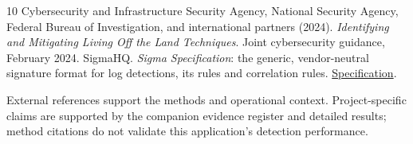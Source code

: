 \documentclass[11pt,a4paper]{article}
\begin{document}
\begin{thebibliography}{10}
 Cybersecurity and Infrastructure Security Agency, National Security Agency, Federal Bureau of Investigation, and international partners (2024). \emph{Identifying and Mitigating Living Off the Land Techniques}. Joint cybersecurity guidance, February 2024.
 SigmaHQ. \emph{Sigma Specification}: the generic, vendor-neutral signature format for log detections, its rules and correlation rules. \href{\detokenize{https://github.com/SigmaHQ/sigma-specification}}{Specification}.
\end{thebibliography}
\endgroup

External references support the methods and operational context. Project-specific claims are supported by the companion evidence register and detailed results; method citations do not validate this application's detection performance.
\end{document}
